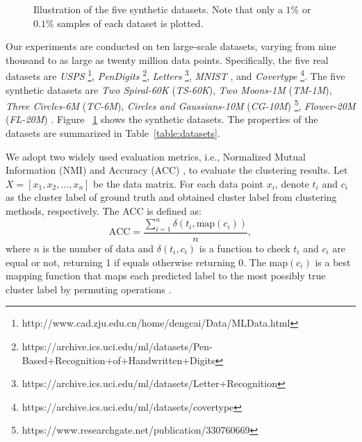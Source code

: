 \begin{figure}\begin{center}
    {}
    {}
    {}
    {}
    {}
    \caption{Illustration of the five synthetic datasets. Note that only a $1\%$ or $0.1\%$ samples of each dataset is plotted.}
    \label{fig:fiveSynDS}
  \end{center}
\end{figure}

Our experiments are conducted on ten large-scale datasets, varying from nine thousand to as large as twenty million data points. Specifically, the five real datasets are \emph{USPS} \cite{cai2010graph} \footnote{\label{cai_deng_data} http://www.cad.zju.edu.cn/home/dengcai/Data/MLData.html}, \emph{PenDigits} \cite{asuncion2007uci} \footnote{https://archive.ics.uci.edu/ml/datasets/Pen-Based+Recognition+of+Handwritten+Digits}, \emph{Letters} \cite{frey1991letter} \footnote{https://archive.ics.uci.edu/ml/datasets/Letter+Recognition}, \emph{MNIST} \cite{cai2011speed} , and \emph{Covertype} \cite{blackard1999comparative} \footnote{https://archive.ics.uci.edu/ml/datasets/covertype}. The five synthetic datasets are \emph{Two Spiral-60K} (\emph{TS-60K}), \emph{Two
  Moons-1M} (\emph{TM-1M}), \emph{Three Circles-6M} (\emph{TC-6M}), \emph{Circles and Gaussians-10M} (\emph{CG-10M}) \cite{huang2019ultra} \footnote{\label{huang}https://www.researchgate.net/publication/330760669}, \emph{Flower-20M} (\emph{FL-20M}) \cite{huang2019ultra} . Figure ~\ref{fig:fiveSynDS} shows the synthetic datasets.
The properties of the datasets are summarized in Table~\ref{table:datasets}.

We adopt two widely used evaluation metrics, i.e., Normalized Mutual Information (NMI) \cite{slonim2000agglomerative} and Accuracy (ACC) \cite{yan2009fast}, to evaluate the clustering results.
Let $X=[x_1,x_2,...,x_n]$ be the data matrix. For each data point $x_i$, denote $t_i$ and $c_i$ as the cluster label of ground truth and obtained cluster label from clustering methods, respectively. The ACC is defined as:
\begin{equation}
  \text{ACC}=\frac{\sum_{i=1}^n \delta(t_i,\text{map}(c_i))}{n},
\end{equation}
where $n$ is the number of data  and $\delta(t_i,c_i)$ is a function to check $t_i$ and $c_i$ are equal or not,  returning 1 if equals otherwise returning 0. The map$(c_i)$ is a best mapping function that maps each predicted label to the most possibly true cluster label by permuting operations \cite{xu2003document}.

